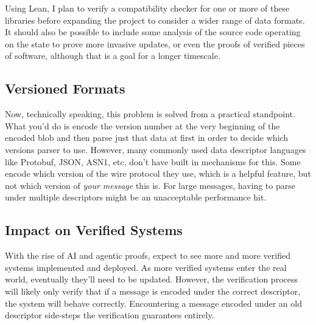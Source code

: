 Using Lean, I plan to verify a compatibility checker for one or more of
these libraries before expanding the project to consider a wider range of data
formats. It should also be possible to include some analysis of the source code
operating on the state to prove more invasive updates, or even the proofs of
verified pieces of software, although that is a goal for a longer timescale.

\subsection{Versioned Formats}

Now, technically speaking, this problem is solved from a practical
standpoint. What you'd do is encode the version number at the very beginning of
the encoded blob and then parse just that data at first in order to decide which
versions parser to use. However, many commonly used data descriptor languages
like Protobuf, JSON, ASN1, etc, don't have built in mechanisms for this. Some
encode which version of the wire protocol they use, which is a helpful feature,
but not which version of \emph{your message} this is. For large messages, having
to parse under multiple descriptors might be an unacceptable performance hit.

\subsection{Impact on Verified Systems}

With the rise of AI and agentic proofs, expect to see more and more verified
systems implemented and deployed. As more verified systems enter the real world,
eventually they'll need to be updated. However, the verification process will
likely only verify that if a message is encoded under the correct descriptor,
the system will behave correctly. Encountering a message encoded under an old
descriptor side-steps the verification guarantees entirely.

